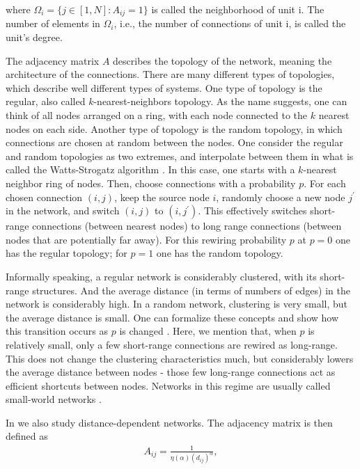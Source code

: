 where $\Omega_i = \{j \in [1, N]: A_{ij} = 1\}$ is called the neighborhood of unit i. The number of elements in $\Omega_i$, i.e., the number of connections of unit i, is called the unit's degree.

The adjacency matrix $A$ describes the topology of the network, meaning the architecture of the connections. There are many different types of topologies, which describe well different types of systems. One type of topology is the regular, also called $k$-nearest-neighbors topology. As the name suggests, one can think of all nodes arranged on a ring, with each node connected to the $k$ nearest nodes on each side. Another type of topology is the random topology, in which connections are chosen at random between the nodes. One consider the regular and random topologies as two extremes, and interpolate between them in what is called the Watts-Strogatz algorithm \cite{watts1998collective}. In this case, one starts with a $k$-nearest neighbor ring of nodes. Then, choose connections with a probability $p$. For each chosen connection $(i,j)$, keep the source node $i$, randomly choose a new node $j^\prime$ in the network, and switch $(i,j)$ to $(i,j^\prime)$. This effectively switches short-range connections (between nearest nodes) to long range connections (between nodes that are potentially far away). For this rewiring probability $p$ at $p=0$ one has the regular topology; for $p=1$ one has the random topology. 

Informally speaking, a regular network is considerably clustered, with its short-range structures. And the average distance (in terms of numbers of edges) in the network is considerably high. In a random network, clustering is very small, but the average distance is small. One can formalize these concepts and show how this transition occurs as $p$ is changed \cite{watts1998collective}. Here, we mention that, when $p$ is relatively small, only a few short-range connections are rewired as long-range. This does not change the clustering characteristics much, but considerably lowers the average distance between nodes - those few long-range connections act as efficient shortcuts between nodes. Networks in this regime are usually called small-world networks \cite{watts1998collective}. 

In  we also study distance-dependent networks. The adjacency matrix is then defined as 
%
\begin{align}
    A_{ij} = \frac{1}{\eta(\alpha)(d_{ij})^\alpha},
\end{align}

